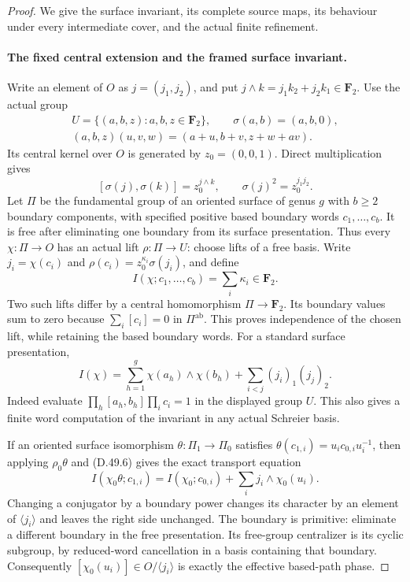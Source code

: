 \begin{proof}
We give the surface invariant, its complete source maps, its behaviour
under every intermediate cover, and the actual finite refinement.

\paragraph{The fixed central extension and the framed surface invariant.}
Write an element of \(O\) as \(j=(j_1,j_2)\), and put
\(j\wedge k=j_1k_2+j_2k_1\in\mathbf F_2\).
Use the actual group
\[
 \begin{gathered}
 U=\{(a,b,z):a,b,z\in\mathbf F_2\},\qquad
 \sigma(a,b)=(a,b,0),\\
 (a,b,z)(u,v,w)=(a+u,b+v,z+w+av).
 \end{gathered}
 \tag{D.49.5}
\]
Its central kernel over \(O\) is generated by \(z_0=(0,0,1)\).
Direct multiplication gives
\[
 [\sigma(j),\sigma(k)]=z_0^{j\wedge k},\qquad
 \sigma(j)^2=z_0^{j_1j_2}.
 \tag{D.49.6}
\]
Let \(\Pi\) be the fundamental group of an oriented surface of genus
\(g\) with \(b\geq2\) boundary components, with specified positive
based boundary words \(c_1,\ldots,c_b\). It is free after eliminating
one boundary from its surface presentation. Thus every
\(\chi:\Pi\to O\) has an actual lift \(\rho:\Pi\to U\): choose lifts
of a free basis. Write
\(j_i=\chi(c_i)\) and
\(\rho(c_i)=z_0^{\kappa_i}\sigma(j_i)\), and define
\[
             I(\chi;c_1,\ldots,c_b)=\sum_i\kappa_i\in\mathbf F_2.
 \tag{D.49.7}
\]
Two such lifts differ by a central homomorphism
\(\Pi\to\mathbf F_2\). Its boundary values sum to zero because
\(\sum_i[c_i]=0\) in \(\Pi^{\mathrm{ab}}\). This proves independence
of the chosen lift, while retaining the based boundary words.
For a standard surface presentation,
\[
 I(\chi)=\sum_{h=1}^g\chi(a_h)\wedge\chi(b_h)
               +\sum_{i<j}(j_i)_1(j_j)_2.
 \tag{D.49.8}
\]
Indeed evaluate \(\prod_h[a_h,b_h]\prod_i c_i=1\) in the displayed
group \(U\). This also gives a finite word computation of the invariant
in any actual Schreier basis.

If an oriented surface isomorphism \(\theta:\Pi_1\to\Pi_0\) satisfies
\(\theta(c_{1,i})=u_ic_{0,i}u_i^{-1}\), then applying \(\rho_0\theta\)
and \textup{(D.49.6)} gives the exact transport equation
\[
 I(\chi_0\theta;c_{1,i})
       =I(\chi_0;c_{0,i})+\sum_i j_i\wedge\chi_0(u_i).
 \tag{D.49.9}
\]
Changing a conjugator by a boundary power changes its character by an
element of \(\langle j_i\rangle\) and leaves the right side unchanged.
The boundary is primitive: eliminate a different boundary in the free
presentation. Its free-group centralizer is its cyclic subgroup, by
reduced-word cancellation in a basis containing that boundary.
Consequently \([\chi_0(u_i)]\in O/\langle j_i\rangle\) is exactly
the effective based-path phase.


\end{proof}
